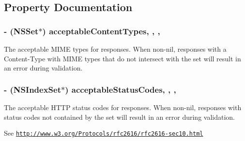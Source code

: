 \subsection{Property Documentation}
\hypertarget{interface_a_f_h_t_t_p_response_serializer_af89f899b8bcb560d179180084961940c}{}
\subsubsection[{acceptable\+Content\+Types}]{\setlength{\rightskip}{0pt plus 5cm}-\/ (N\+S\+Set$\ast$) acceptable\+Content\+Types\hspace{0.3cm}{\ttfamily [read]}, {\ttfamily [write]}, {\ttfamily [nonatomic]}, {\ttfamily [copy]}}\label{interface_a_f_h_t_t_p_response_serializer_af89f899b8bcb560d179180084961940c}
The acceptable M\+I\+M\+E types for responses. When non-\/{\ttfamily nil}, responses with a {\ttfamily Content-\/\+Type} with M\+I\+M\+E types that do not intersect with the set will result in an error during validation. \hypertarget{interface_a_f_h_t_t_p_response_serializer_a5d977b3a90fdc06ed91b875deacc0c5c}{}
\subsubsection[{acceptable\+Status\+Codes}]{\setlength{\rightskip}{0pt plus 5cm}-\/ (N\+S\+Index\+Set$\ast$) acceptable\+Status\+Codes\hspace{0.3cm}{\ttfamily [read]}, {\ttfamily [write]}, {\ttfamily [nonatomic]}, {\ttfamily [copy]}}\label{interface_a_f_h_t_t_p_response_serializer_a5d977b3a90fdc06ed91b875deacc0c5c}
The acceptable H\+T\+T\+P status codes for responses. When non-\/{\ttfamily nil}, responses with status codes not contained by the set will result in an error during validation.

See \href{http://www.w3.org/Protocols/rfc2616/rfc2616-sec10.html}{\tt http\+://www.\+w3.\+org/\+Protocols/rfc2616/rfc2616-\/sec10.\+html} \hypertarget{interface_a_f_h_t_t_p_response_serializer_a91382381388e01522dabf5c81e91ca62}{}
